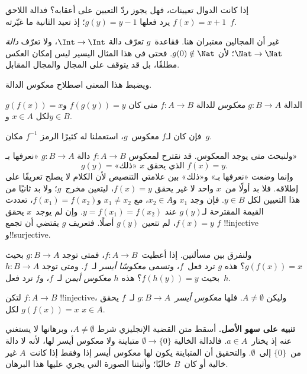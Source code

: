 \documentclass[../../../include/open-logic-section]{subfiles}
\begin{document}

\begin{explain}
إذا كانت الدوال تعيينات، فهل يجوز ردّ التعيين على أعقابه؟
فدالة اللاحق $f(x) = x + 1$ يرد فعلها $g(y) = y - 1$؛ إذ
تعيد الثانية ما غيّرته~$f$.

غير أن المجالين معتبران هنا. فقاعدة~$g$ تعرّف دالة
$\Int \to \Int$، ولا تعرّف \emph{دالة} $\Nat
\to \Nat$؛ لأن $g(0) \notin \Nat$. فحتى في هذا المثال اليسير
ليس إمكان العكس مطلقًا، بل قد يتوقف على المجال والمجال المقابل.

ويضبط هذا المعنى اصطلاح معكوس الدالة.
\end{explain}

\begin{defn}
الدالة $g \colon B \to A$ \emph{معكوس} للدالة $f
\colon A \to B$ متى كان $f(g(y)) = y$ و$g(f(x)) = x$ لكل
$x \in A$ و$y \in B$.
\end{defn}

فإن كان لـ$f$ معكوس~$g$، استعملنا له كثيرًا الرمز $f^{-1}$ مكان~$g$.

\begin{explain}
ولنبحث متى يوجد المعكوس. قد نقترح لمعكوس $f\colon A \to B$
دالة $g\colon B \to A$ «نعرفها بـ»
\[
g(y) = \text{«ذلك» $x$ الذي يحقق $f(x) = y$.}
\]
وإنما وضعت «نعرفها بـ» و«ذلك» بين علامتي التنصيص لأن الكلام
لا يصلح تعريفًا على إطلاقه. فلا بد أولًا من~$x$ واحد لا غير
يحقق $f(x) = y$، ليتعين مخرج~$g$؛ ولا بد ثانيًا من هذا التعيين
لكل $y \in B$. فإن وجد $x_1$ و$x_2 \in A$، مع $x_1 \neq x_2$
و$f(x_1) = f(x_2)$، تعددت القيمة المقترحة لـ$g(y)$ عند
$y = f(x_1) = f(x_2)$. وإن لم يوجد~$x$ يحقق $f(x) = y$،
لم تتعين $g(y)$ أصلًا. فتعريف $g$ يقتضي أن تجمع $f$
!!{injective} و!!{surjective}.

ولنفرق بين مسألتين. إذا أعطيت~$f\colon A \to B$، فمتى توجد
$g\colon B \to A$ بحيث $g(f(x)) = x$؟ هذه $g$ ترد فعل~$f$،
وتسمى \emph{معكوسًا أيسر} لـ~$f$. ومتى توجد $h\colon B \to A$
بحيث $f(h(y)) = y$؟ هذه $h$ \emph{معكوس أيمن} لـ~$f$،
و$f$ ترد فعل~$h$.
\end{explain}

\begin{prop}
لتكن $f\colon A \to B$ !!{injective}، وليكن $A \neq \emptyset$.
فلها \emph{معكوس أيسر}~$g\colon B \to A$ لـ~$f$ يحقق $g(f(x)) = x$
لكل $x \in A$.
\end{prop}

\begin{explain}
\textbf{تنبيه على سهو الأصل.} أسقط متن القضية الإنجليزي شرط
$A\neq\emptyset$، وبرهانها لا يستغني عنه إذ يختار~$a\in A$.
فالدالة الخالية $\emptyset\to\{0\}$ متباينة ولا معكوس أيسر لها،
لأنه لا دالة من~$\{0\}$ إلى~$\emptyset$. والتحقيق أن المتباينة
يكون لها معكوس أيسر إذا وفقط إذا كانت~$A$ غير خالية أو كان~$B$
خاليًا؛ وأثبتنا الصورة التي يجري عليها هذا البرهان.
\end{explain}
\end{document}
